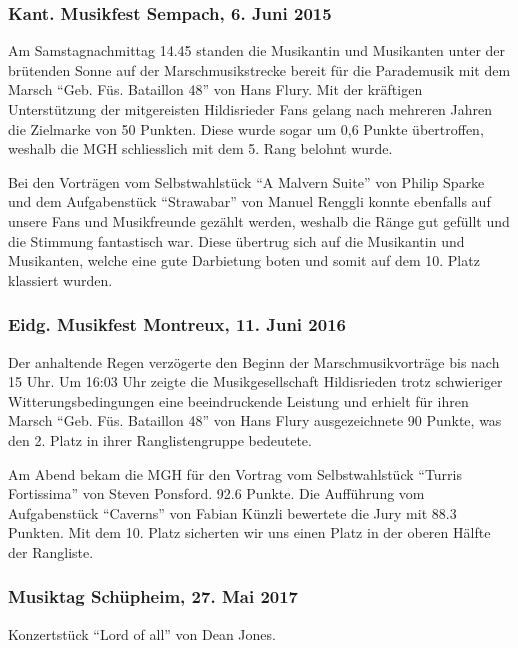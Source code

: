 \begin{history}
    \subsubsection*{Kant. Musikfest Sempach, 6. Juni 2015}

    Am Samstagnachmittag 14.45 standen die Musikantin und Musikanten unter der
    brütenden Sonne auf der Marschmusikstrecke bereit für die Parademusik mit
    dem Marsch \enquote{Geb. Füs. Bataillon 48} von Hans Flury. Mit der
    kräftigen Unterstützung der mitgereisten Hildisrieder Fans gelang nach
    mehreren Jahren die Zielmarke von 50 Punkten. Diese wurde sogar um 0,6
    Punkte übertroffen, weshalb die MGH schliesslich mit dem 5. Rang belohnt
    wurde.

    Bei den Vorträgen vom Selbstwahlstück \enquote{A Malvern Suite} von Philip
    Sparke und dem Aufgabenstück \enquote{Strawabar} von Manuel Renggli konnte
    ebenfalls auf unsere Fans und Musikfreunde gezählt werden, weshalb die Ränge
    gut gefüllt und die Stimmung fantastisch war.  Diese übertrug sich auf die
    Musikantin und Musikanten, welche eine gute Darbietung boten und somit auf
    dem 10. Platz klassiert wurden.


    \subsubsection*{Eidg. Musikfest Montreux, 11. Juni 2016}

    Der anhaltende Regen verzögerte den Beginn der Marschmusikvorträge bis nach
    15 Uhr. Um 16:03 Uhr zeigte die Musikgesellschaft Hildisrieden trotz
    schwieriger Witterungsbedingungen eine beeindruckende Leistung und erhielt
    für ihren Marsch \enquote{Geb. Füs. Bataillon 48} von Hans Flury
    ausgezeichnete 90 Punkte, was den 2. Platz in ihrer Ranglistengruppe
    bedeutete.

    Am Abend bekam die MGH für den Vortrag vom Selbstwahlstück \enquote{Turris
        Fortissima} von Steven Ponsford. 92.6 Punkte. Die Aufführung vom
    Aufgabenstück \enquote{Caverns} von Fabian Künzli bewertete die Jury mit
    88.3 Punkten. Mit dem 10. Platz sicherten wir uns einen Platz in der
    oberen Hälfte der Rangliste.


    \subsubsection*{Musiktag Schüpheim, 27. Mai 2017}

    Konzertstück \enquote{Lord of all} von Dean Jones.


\end{history}
